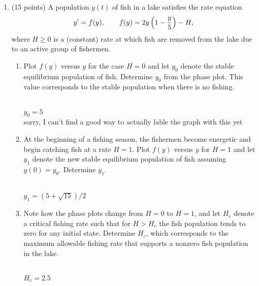 \documentclass{article}
\begin{document}
\begin{enumerate}

\item (15 points) A population $y(t)$ of fish in a lake satisfies the rate equation
\[
y'=f(y),\qquad f(y)=2y\left(1-{y\over5}\right)-H,
\]
where $H\ge0$ is a (constant) rate at which fish are removed from the lake due to an active group of fishermen.
\begin{enumerate}
\item
Plot $f(y)$ versus $y$ for the case $H=0$ and let $y_0$ denote the stable equilibrium population of fish.  Determine $y_0$ from the phase plot.  This value corresponds to the stable population when there is no fishing.
\\
\\$y_0 = 5$
\\sorry, I can't find a good way to actually lable the graph with this yet
\\

\item
At the beginning of a fishing season, the fishermen become energetic and begin catching fish at a rate $H=1$.  Plot $f(y)$ versus $y$ for $H=1$ and let $y_1$ denote the new stable equilibrium population of fish assuming $y(0)=y_0$.  Determine $y_1$.
\\
\\$y_1 = (5+\sqrt{15})/2$
\item
Note how the phase plots change from $H=0$ to $H=1$, and let $H_c$ denote a critical fishing rate such that for $H>H_c$ the fish population tends to zero for any initial state.  Determine $H_c$, which corresponds to the maximum allowable fishing rate that supports a nonzero fish population in the lake.
\\
\\$H_c = 2.5$
\end{enumerate}


\end{enumerate}
\end{document}
